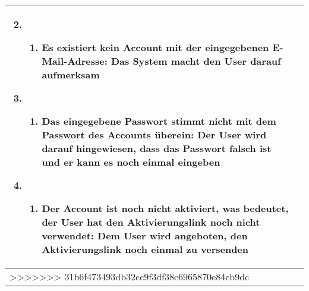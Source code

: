\begin{tabular}{|l|p{}|}
\begin{enumerate}
\setcounter{enumi}{1}
\item 
\begin{enumerate}
\item Es existiert kein Account mit der eingegebenen E-Mail-Adresse: Das System macht den User darauf aufmerksam
\end{enumerate}
\item
\begin{enumerate}
\item Das eingegebene Passwort stimmt nicht mit dem Passwort des Accounts überein: Der User wird darauf hingewiesen, dass das Passwort falsch ist und er kann es noch einmal eingeben
\end{enumerate}
\item
\begin{enumerate}
\item Der Account ist noch nicht aktiviert, was bedeutet, der User hat den Aktivierungslink noch nicht verwendet: Dem User wird angeboten, den Aktivierungslink noch einmal zu versenden
\end{enumerate}
\end{enumerate}
\\ \hline
>>>>>>> 31b6f473493db32cc9f3df38c6965870e84cb9dc
\end{tabular}